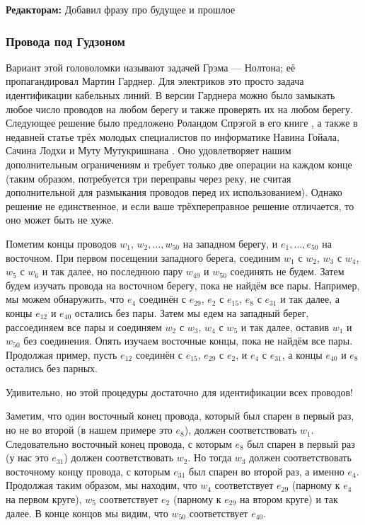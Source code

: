 \begin{addedbytheeditors}
\textbf{Редакторам:} Добавил фразу про будущее и прошлое
\end{addedbytheeditors}


\subsubsection*{Провода под Гудзоном}

Вариант этой головоломки называют задачей Грэма --- Нолтона;
её пропагандировал Мартин Гарднер.
Для электриков это просто задача идентификации кабельных линий.
В версии Гарднера можно было замыкать любое число проводов на любом берегу и также проверять их на любом берегу.
Следующее решение было предложено Роландом Спрэгой в его книге \cite{54}, а также в недавней статье трёх молодых специалистов по информатике Навина Гойала, Сачина Лодхи и Муту Мутукришнана \cite{33}.
Оно удовлетворяет нашим дополнительным ограничениям и требует только две операции на каждом конце (таким образом, потребуется три переправы через реку, не считая дополнительной для размыкания проводов перед их использованием).
Однако решение не единственное, и если ваше трёхпереправное решение отличается, то оно может быть не хуже.

Пометим концы проводов $w_1$, $w_2, \dots, w_{50}$ на западном берегу,
и $e_1, \dots, e_{50}$ на восточном. %
При первом посещении западного берега, соединим $w_1$ с $w_2$, $w_3$ с $w_4$, $w_5$ с $w_6$ и так далее, но последнюю пару $w_{49}$ и $w_{50}$ соединять не будем.
Затем будем изучать провода на восточном берегу, пока не найдём все пары.
Например, мы можем обнаружить, что $e_4$ соединён с $e_{29}$, $e_2$ с $e_{15}$, $e_8$ с $e_{31}$ и так далее, а концы $e_{12}$ и $e_{40}$ остались без пары.
Затем мы едем на западный берег, рассоединяем все пары и соединяем $w_2$ с $w_3$, $w_4$ с $w_5$ и так далее, оставив $w_1$ и $w_{50}$ без соединения.
Опять изучаем восточные концы, пока не найдём все пары.
Продолжая пример, пусть $e_{12}$ соединён с $e_{15}$, $e_{29}$ с $e_2$, и $e_4$ с $e_{31}$, а концы $e_{40}$ и $e_8$ остались без парных.

Удивительно, но этой процедуры достаточно для идентификации всех проводов!

Заметим, что один восточный конец провода, который был спарен в первый раз, но не во второй (в нашем примере это $e_8$), должен соответствовать $w_1$.
Следовательно восточный конец провода, с которым $e_8$ был спарен в первый раз (у нас это $e_{31}$) должен соответствовать $w_2$.
Но тогда $w_3$ должен соответствовать восточному концу провода, с которым $e_{31}$ был спарен во второй раз, а именно $e_4$.
Продолжая таким образом, мы находим, что $w_4$ соответствует $e_{29}$ (парному к $e_4$ на первом круге), $w_5$ соответствует $e_2$ (парному к $e_{29}$ на втором круге) и так далее.
В конце концов мы видим, что $w_{50}$ соответствует $e_{40}$.

